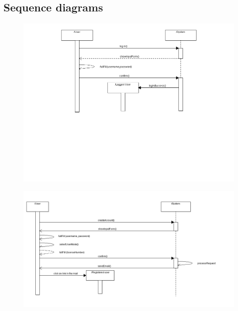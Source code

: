 \subsection{Sequence diagrams}
\begin{center}
	\begin{figure} [h]
    	\includegraphics [scale=0.5]{sequencelogin.png}
	\end{figure}
	\end{center}
	\newpage

\begin{center}
	\begin{figure} [h]
    	\includegraphics [scale=0.4]{sequenceregister.png}
	\end{figure}
	\end{center}
	\newpage

